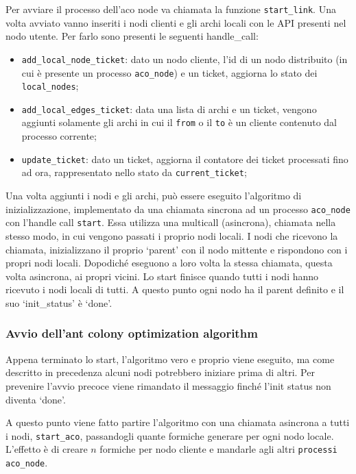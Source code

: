 Per avviare il processo dell'aco node va chiamata la funzione \texttt{start\_link}. 
Una volta avviato vanno inseriti i nodi clienti e gli archi locali con le API presenti nel nodo utente.
Per farlo sono presenti le seguenti handle\_call:
\begin{itemize}
    \item \texttt{add\_local\_node\_ticket}: dato un nodo cliente, l'id di un nodo distribuito (in cui è presente un processo \texttt{aco\_node}) e un ticket, aggiorna lo stato dei \texttt{local\_nodes};
    \item \texttt{add\_local\_edges\_ticket}: data una lista di archi e un ticket, vengono aggiunti solamente gli archi in cui il \texttt{from} o il \texttt{to} è un cliente contenuto dal processo corrente;
    \item \texttt{update\_ticket}: dato un ticket, aggiorna il contatore dei ticket processati fino ad ora, rappresentato nello stato da \texttt{current\_ticket};
\end{itemize}
Una volta aggiunti i nodi e gli archi, può essere eseguito l'algoritmo di inizializzazione, implementato da una chiamata sincrona ad un processo \texttt{aco\_node} con l'handle call \texttt{start}.
Essa utilizza una multicall (asincrona), chiamata nella stesso modo, in cui vengono passati i proprio nodi locali. 
I nodi che ricevono la chiamata, inizializzano il proprio `parent' con il nodo mittente e rispondono con i propri nodi locali. Dopodiché eseguono a loro volta la stessa chiamata, questa volta asincrona, ai propri vicini.
Lo start finisce quando tutti i nodi hanno ricevuto i nodi locali di tutti. A questo punto ogni nodo ha il parent definito e il suo `init\_status' è `done'.

\subsubsection{Avvio dell'ant colony optimization algorithm}
Appena terminato lo start, l'algoritmo vero e proprio viene eseguito, ma come descritto in precedenza alcuni nodi potrebbero iniziare prima di altri. Per prevenire l'avvio precoce viene rimandato il messaggio finché l'init status non diventa `done'.

A questo punto viene fatto partire l'algoritmo con una chiamata asincrona a tutti i nodi, \texttt{start\_aco}, passandogli quante formiche generare per ogni nodo locale.
L'effetto è di creare $n$ formiche per nodo cliente e mandarle agli altri \texttt{processi aco\_node}.

